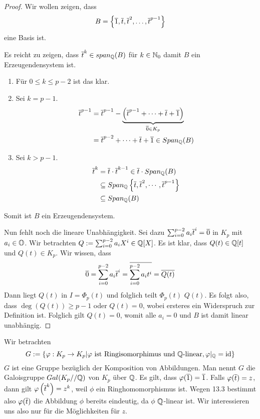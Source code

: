 \documentclass[12pt,a4paper]{scrartcl}
\begin{document}
\begin{proof}
	Wir wollen zeigen, dass
	\begin{equation*}
		B = \left\lbrace \overline{1}, \overline{t}, \overline{t}^2, \dots, \overline{t}^{p-1} \right\rbrace 
	\end{equation*}
	eine Basis ist.
	
	Es reicht zu zeigen, dass $\overline{t}^k \in span_{\mathbb Q}(B)$ für $k \in \mathbb N_0$ damit $B$ ein Erzeugendensystem ist.
	\begin{enumerate}
		\item Für $0 \leq k \leq p-2$ ist das klar.
		\item Sei $k = p-1$. 
			\begin{align*}
				\overline{t}^{p-1} &= \overline{t}^{p-1}- \underbrace{\left( \overline{t}^{p-1} + \dots + \overline{t} + \overline{1} \right)}_{\overline{0} \in K_p} \\
				&= \overline{t}^{p-2} + \dots + \overline{t} + \overline{1} \in Span_{\mathbb Q}(B)
			\end{align*}
		\item Sei $k > p-1$.
			\begin{align*}
				\overline{t}^k &= \overline{t} \cdot \overline{t}^{k-1} \in \overline{t} \cdot Span_{\mathbb Q}(B) \\
				&\subseteq Span_{\mathbb Q}\left\lbrace \overline{t}, \overline{t}^2, \cdots , \overline{t} ^ {p-1} \right\rbrace \\
				&\subseteq Span_{\mathbb Q}(B)
			\end{align*}
	\end{enumerate}
	Somit ist $B$ ein Erzeugendensystem.
	
	Nun fehlt noch die lineare Unabhängigkeit. Sei dazu $\sum_{i=0}^{p-2}a_i\overline{t}^i = \overline{0}$ in $K_p$ mit $a_i \in \mathbb O$. Wir betrachten $Q := \sum_{i=0}^{p-2}a_iX^i \in \mathbb Q[X]$. Es ist klar, dass $Q(t) \in \mathbb Q[t]$ und $Q(t) \in K_p$. Wir wissen, dass
	\begin{equation}
		\overline{0} = \sum_{i=0}^{p-2}a_i\overline{t}^i = \overline{\sum_{i=0}^{p-2}a_it^i} = \overline{Q(t)}
	\end{equation}
	Dann liegt $Q(t)$ in $I = \Phi_p(t)$ und folglich teilt $\Phi_p(t)$ $Q(t)$. Es folgt also, dass $\deg(Q(t)) \geq p-1$ oder $Q(t) = 0$, wobei ersteres ein Widerspruch zur Definition ist. Folglich gilt $Q(t) = 0$, womit alle $a_i = 0$ und $B$ ist damit linear unabhängig. 
\end{proof}

Wir betrachten 
\begin{equation*}
	G := \left\lbrace \varphi: K_p \to K_p \middle| \varphi \text{ ist Ringisomorphimus und } \mathbb Q\text{-linear}, \varphi \vert_{\mathbb Q} = \operatorname{id} \right\rbrace 
\end{equation*}
$G$ ist eine Gruppe bezüglich der Komposition von Abbildungen. Man nennt $G$ die Galoisgruppe $Gal(K_p // \mathbb Q)$ von $K_p$ über $\mathbb Q$.
Es gilt, dass $\varphi(\overline{1}) = \overline{1}$. Falls $\varphi(\overline{t}) = z$, dann gilt $\varphi\left( \overline{t} ^k \right) = z^k$, weil $\phi$ ein Ringhomomorphismus ist.
Wegen 13.3 bestimmt also $\varphi(\overline t)$ die Abbildung $\phi$ bereits eindeutig, da $\phi$ $\mathbb Q$-linear ist. Wir interessieren uns also nur für die Möglichkeiten für $z$.
\end{document}
